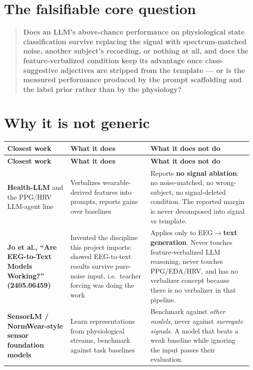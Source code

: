 \documentclass[11pt]{article}
\begin{document}
\section{The falsifiable core question}

\begin{quote}
\textbf{Does an LLM's above-chance performance on physiological state
classification survive replacing the signal with spectrum-matched noise,
another subject's recording, or nothing at all, and does the
feature-verbalized condition keep its advantage once class-suggestive
adjectives are stripped from the template --- or is the measured performance
produced by the prompt scaffolding and the label prior rather than by the
physiology?}
\end{quote}

\section{Why it is not generic}

\begin{longtable}{@{}L{0.25\textwidth}L{0.31\textwidth}L{0.34\textwidth}@{}}
\toprule
\textbf{\color{Accent}Closest work} & \textbf{\color{Accent}What it does} & \textbf{\color{Accent}What it does not do}\\
\midrule
\endfirsthead
\toprule
\textbf{\color{Accent}Closest work} & \textbf{\color{Accent}What it does} & \textbf{\color{Accent}What it does not do}\\
\midrule
\endhead
\bottomrule
\endlastfoot
\textbf{Health-LLM} and the PPG/HRV LLM-agent line &
Verbalizes wearable-derived features into prompts, reports gains over
baselines &
Reports \textbf{no signal ablation}: no noise-matched, no wrong-subject, no
signal-deleted condition. The reported margin is never decomposed into signal
vs template.\\
\addlinespace
\textbf{Jo et al., ``Are EEG-to-Text Models Working?'' (2405.06459)} &
Invented the discipline this project imports: showed EEG-to-text results
survive pure-noise input, i.e.\ teacher forcing was doing the work &
Applies only to EEG$\rightarrow$\textbf{text generation}. Never touches
feature-verbalized LLM reasoning, never touches PPG/EDA/HRV, and has no
verbalizer concept because there is no verbalizer in that pipeline.\\
\addlinespace
\textbf{SensorLM / NormWear-style sensor foundation models} &
Learn representations from physiological streams, benchmark against task
baselines &
Benchmark against \emph{other models}, never against \emph{surrogate signals}.
A model that beats a weak baseline while ignoring the input passes their
evaluation.\\
\end{longtable}
\end{document}
